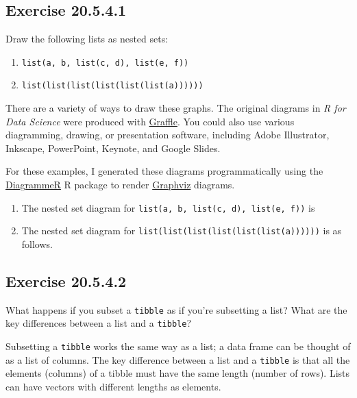 \documentclass[]{book}
\providecommand{\tightlist}{%
  \setlength{\itemsep}{0pt}\setlength{\parskip}{0pt}}
\theoremstyle{plain}
\theoremstyle{remark}
\begin{document}
\hypertarget{exercise-20.5.4.1}{%
\subsection*{\texorpdfstring{Exercise
{20.5.4.1}}{Exercise 20.5.4.1}}\label{exercise-20.5.4.1}}

Draw the following lists as nested sets:

\begin{enumerate}
\def\labelenumi{\arabic{enumi}.}
\tightlist
\item
  \texttt{list(a,\ b,\ list(c,\ d),\ list(e,\ f))}
\item
  \texttt{list(list(list(list(list(list(a))))))}
\end{enumerate}

There are a variety of ways to draw these graphs. The original diagrams
in \emph{R for Data Science} were produced with
\href{https://www.omnigroup.com/omnigraffle}{Graffle}. You could also
use various diagramming, drawing, or presentation software, including
Adobe Illustrator, Inkscape, PowerPoint, Keynote, and Google Slides.

For these examples, I generated these diagrams programmatically using
the
\href{http://rich-iannone.github.io/DiagrammeR/graphviz_and_mermaid.html}{DiagrammeR}
R package to render \href{https://www.graphviz.org/}{Graphviz} diagrams.

\begin{enumerate}
\def\labelenumi{\arabic{enumi}.}
\item
  The nested set diagram for
  \texttt{list(a,\ b,\ list(c,\ d),\ list(e,\ f))} is
\item
  The nested set diagram for
  \texttt{list(list(list(list(list(list(a))))))} is as follows.
\end{enumerate}

\hypertarget{exercise-20.5.4.2}{%
\subsection*{\texorpdfstring{Exercise
{20.5.4.2}}{Exercise 20.5.4.2}}\label{exercise-20.5.4.2}}

What happens if you subset a \texttt{tibble} as if you're subsetting a
list? What are the key differences between a list and a \texttt{tibble}?

Subsetting a \texttt{tibble} works the same way as a list; a data frame
can be thought of as a list of columns. The key difference between a
list and a \texttt{tibble} is that all the elements (columns) of a
tibble must have the same length (number of rows). Lists can have
vectors with different lengths as elements.
\end{document}
